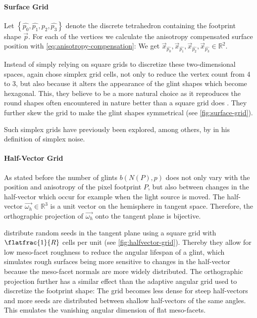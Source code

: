 \paragraph{Surface Grid}
%
Let $\left\{\hat{p_0},\hat{p_1},\hat{p_2},\hat{p_3}\right\}$ denote the discrete tetrahedron containing the footprint shape $\vec{p}$.
%
For each of the vertices we calculate the anisotropy compensated surface position with \cref{eq:anisotropy-compensation}: We get $\vec{x}_{\hat{p_0}}, \vec{x}_{\hat{p_1}}, \vec{x}_{\hat{p_2}}, \vec{x}_{\hat{p_3}} \in \mathbb{R}^2$.


Instead of simply relying on square grids to discretize these two-dimensional spaces, \textcite{deliot2023} again chose simplex grid cells, not only to reduce the vertex count from 4 to 3, but also because it alters the appearance of the glint shapes which become hexagonal.
%
This, they believe to be a more natural choice as it reproduces the round shapes often encountered in nature better than a square grid does \parencite{deliot2023}.
%
They further skew the grid to make the glint shapes symmetrical (see \cref{fig:surface-grid}).



Such simplex grids have previously been explored, among others, by \textcite{perlin2001} in his definition of simplex noise.


\paragraph{Half-Vector Grid}
%
As stated before the number of glints $b(N(P),p)$ does not only vary with the position and anisotropy of the pixel footprint $P$, but also between changes in the half-vector which occur for example when the light source is moved.
%
The half-vector $\vec{\omega_h} \in \mathbb{R}^3$ is a unit vector on the hemisphere in tangent space.
%
Therefore, the orthographic projection of $\vec{\omega_h}$ onto the tangent plane is bijective.



\textcite{deliot2023} distribute random seeds in the tangent plane using a square grid with $\flatfrac{1}{R}$ cells per unit (see \cref{fig:halfvector-grid}).
%
Thereby they allow for low meso-facet roughness to reduce the angular lifespan of a glint, which simulates rough surfaces being more sensitive to changes in the half-vector because the meso-facet normals are more widely distributed.
%
The orthographic projection further has a similar effect than the adaptive angular grid used to discretize the footprint shape: 
%
The grid becomes less dense for steep half-vectors and more seeds are distributed between shallow half-vectors of the same angles.
%
This emulates the vanishing angular dimension of flat meso-facets.


